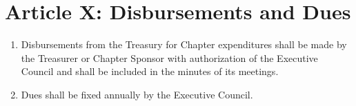 \section*{Article X: Disbursements and Dues}

\begin{enumerate}
    \item Disbursements from the Treasury for Chapter expenditures shall be made by the Treasurer or Chapter Sponsor with authorization of the Executive Council and shall be included in the minutes of its meetings.
    \item Dues shall be fixed annually by the Executive Council.
\end{enumerate}
